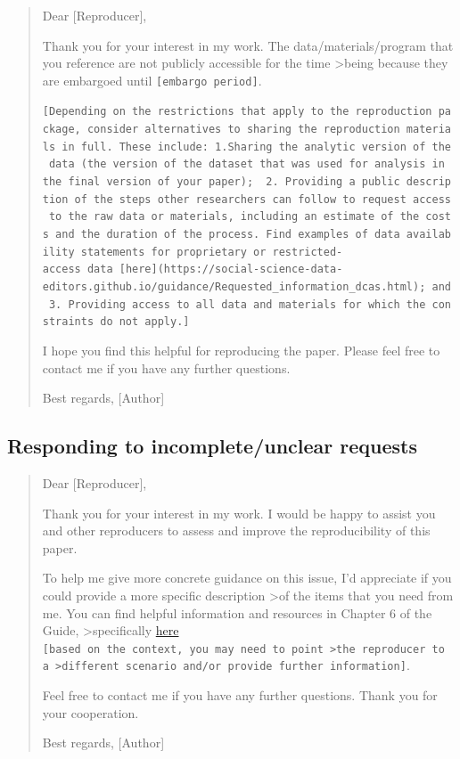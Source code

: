 \documentclass[]{book}
\begin{document}
\begin{quote}
Dear {[}Reproducer{]},

Thank you for your interest in my work. The data/materials/program that you reference are not publicly accessible for the time \textgreater{}being because they are embargoed until \texttt{{[}embargo\ period{]}}.

\texttt{{[}Depending\ on\ the\ restrictions\ that\ apply\ to\ the\ reproduction\ package,\ consider\ alternatives\ to\ sharing\ the\ reproduction\ materials\ in\ full.\ These\ include:\ 1.Sharing\ the\ analytic\ version\ of\ the\ data\ (the\ version\ of\ the\ dataset\ that\ was\ used\ for\ analysis\ in\ the\ final\ version\ of\ your\ paper);\ \ 2.\ Providing\ a\ public\ description\ of\ the\ steps\ other\ researchers\ can\ follow\ to\ request\ access\ to\ the\ raw\ data\ or\ materials,\ including\ an\ estimate\ of\ the\ costs\ and\ the\ duration\ of\ the\ process.\ Find\ examples\ of\ data\ availability\ statements\ for\ proprietary\ or\ restricted-access\ data\ {[}here{]}(https://social-science-data-editors.github.io/guidance/Requested\_information\_dcas.html);\ and\ 3.\ Providing\ access\ to\ all\ data\ and\ materials\ for\ which\ the\ constraints\ do\ not\ apply.{]}}

I hope you find this helpful for reproducing the paper. Please feel free to contact me if you have any further questions.

Best regards,
{[}Author{]}
\end{quote}

\hypertarget{responding-to-incompleteunclear-requests}{%
\subsection{Responding to incomplete/unclear requests}\label{responding-to-incompleteunclear-requests}}

\begin{quote}
Dear {[}Reproducer{]},

Thank you for your interest in my work. I would be happy to assist you and other reproducers to assess and improve the reproducibility of this paper.

To help me give more concrete guidance on this issue, I'd appreciate if you could provide a more specific description \textgreater{}of the items that you need from me. You can find helpful information and resources in Chapter 6 of the Guide, \textgreater{}specifically \href{https://bitss.github.io/ACRE/guidance-for-a-constructive-exchange-between-reproducers-and-original-authors.html\#asking-for-additional-guidance-when-some-materials-have-been-shared}{here} \texttt{{[}based\ on\ the\ context,\ you\ may\ need\ to\ point\ \textgreater{}the\ reproducer\ to\ a\ \textgreater{}different\ scenario\ and/or\ provide\ further\ information{]}}.

Feel free to contact me if you have any further questions. Thank you for your cooperation.

Best regards,
{[}Author{]}
\end{quote}
\end{document}
